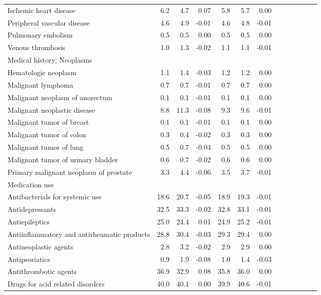 \documentclass[11pt,]{article}
\begin{document}
\begin{longtable}{lrrrrrrrrrrrr}
      Ischemic heart disease &  6.2 &  4.7 &  0.07 &  5.8 &  5.7 &  0.00 \\ 
      Peripheral vascular disease &  4.6 &  4.9 & -0.01 &  4.6 &  4.8 & -0.01 \\ 
      Pulmonary embolism &  0.5 &  0.5 &  0.00 &  0.5 &  0.5 &  0.00 \\ 
      Venous thrombosis &  1.0 &  1.3 & -0.02 &  1.1 &  1.1 & -0.01 \\ 
  Medical history: Neoplasms &    &    &     &    &    &     \\ 
      Hematologic neoplasm &  1.1 &  1.4 & -0.03 &  1.2 &  1.2 &  0.00 \\ 
      Malignant lymphoma &  0.7 &  0.7 & -0.01 &  0.7 &  0.7 &  0.00 \\ 
      Malignant neoplasm of anorectum &  0.1 &  0.1 & -0.01 &  0.1 &  0.1 &  0.00 \\ 
      Malignant neoplastic disease &  8.8 & 11.3 & -0.08 &  9.3 &  9.6 & -0.01 \\ 
      Malignant tumor of breast &  0.1 &  0.1 & -0.01 &  0.1 &  0.1 &  0.00 \\ 
      Malignant tumor of colon &  0.3 &  0.4 & -0.02 &  0.3 &  0.3 &  0.00 \\ 
      Malignant tumor of lung &  0.5 &  0.7 & -0.04 &  0.5 &  0.5 &  0.00 \\ 
      Malignant tumor of urinary bladder &  0.6 &  0.7 & -0.02 &  0.6 &  0.6 &  0.00 \\ 
      Primary malignant neoplasm of prostate &  3.3 &  4.4 & -0.06 &  3.5 &  3.7 & -0.01 \\ 
  Medication use &    &    &     &    &    &     \\ 
      Antibacterials for systemic use & 18.6 & 20.7 & -0.05 & 18.9 & 19.3 & -0.01 \\ 
      Antidepressants & 32.5 & 33.3 & -0.02 & 32.8 & 33.1 & -0.01 \\ 
      Antiepileptics & 25.0 & 24.4 &  0.01 & 24.9 & 25.2 & -0.01 \\ 
      Antiinflammatory and antirheumatic products & 28.8 & 30.4 & -0.03 & 29.3 & 29.4 &  0.00 \\ 
      Antineoplastic agents &  2.8 &  3.2 & -0.02 &  2.9 &  2.9 &  0.00 \\ 
      Antipsoriatics &  0.9 &  1.9 & -0.08 &  1.0 &  1.4 & -0.03 \\ 
      Antithrombotic agents & 36.9 & 32.9 &  0.08 & 35.8 & 36.0 &  0.00 \\ 
      Drugs for acid related disorders & 40.0 & 40.1 &  0.00 & 39.9 & 40.6 & -0.01 \\ 

\end{longtable}
\end{document}

